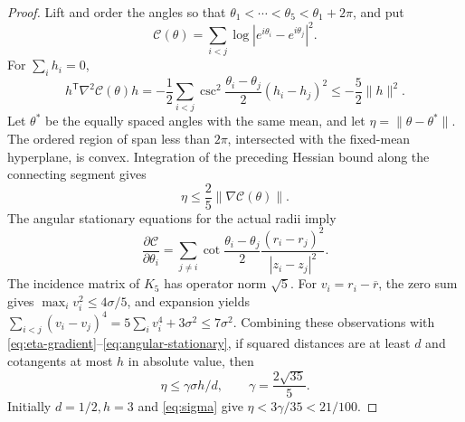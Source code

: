\documentclass[11pt]{article}
\theoremstyle{remark}
\newcommand{\norm}[1]{\lVert#1\rVert}
\numberwithin{equation}{section}
\begin{document}
\begin{proof}
Lift and order the angles so that
$\theta_1<\cdots<\theta_5<\theta_1+2\pi$, and put
\[
 \mathcal C(\theta)=\sum_{i<j}
       \log|e^{i\theta_i}-e^{i\theta_j}|^2.
\]
For $\sum_i h_i=0$,
\[
 h^{\mathsf T}\nabla^2\mathcal C(\theta)h
 =-\frac12\sum_{i<j}
   \csc^2\frac{\theta_i-\theta_j}{2}(h_i-h_j)^2
 \le-\frac52\norm h^2.
\]
Let $\theta^*$ be the equally spaced angles with the same mean, and let
$\eta=\norm{\theta-\theta^*}$. The ordered region of span less than
$2\pi$, intersected with the fixed-mean hyperplane, is convex.
Integration of the preceding Hessian bound along the connecting segment
gives
\begin{equation}\label{eq:eta-gradient}
 \eta\le\frac25\norm{\nabla\mathcal C(\theta)}.
\end{equation}
The angular stationary equations for the actual radii imply
\begin{equation}\label{eq:angular-stationary}
 \frac{\partial\mathcal C}{\partial\theta_i}
 =\sum_{j\ne i}\cot\frac{\theta_i-\theta_j}{2}
       \frac{(r_i-r_j)^2}{|z_i-z_j|^2}.
\end{equation}
The incidence matrix of $K_5$ has operator norm $\sqrt5$.
For $v_i=r_i-\overline r$, the zero sum gives
$\max_i v_i^2\le4\sigma/5$, and expansion yields
$\sum_{i<j}(v_i-v_j)^4=5\sum_i v_i^4+3\sigma^2\le7\sigma^2$.
Combining these observations with
\eqref{eq:eta-gradient}--\eqref{eq:angular-stationary}, if squared
distances are at least $d$ and cotangents at most $h$ in absolute value,
then
\begin{equation}\label{eq:eta-basic}
 \eta\le\gamma\sigma h/d,\qquad \gamma=\frac{2\sqrt{35}}5.
\end{equation}
Initially $d=1/2,h=3$ and \eqref{eq:sigma} give
$\eta<3\gamma/35<21/100$.


\end{proof}
\end{document}
